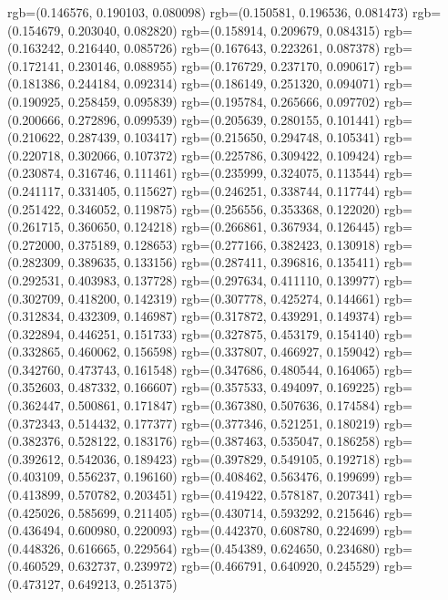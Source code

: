 {{{					rgb=(0.146576, 0.190103, 0.080098)
					rgb=(0.150581, 0.196536, 0.081473)
					rgb=(0.154679, 0.203040, 0.082820)
					rgb=(0.158914, 0.209679, 0.084315)
					rgb=(0.163242, 0.216440, 0.085726)
					rgb=(0.167643, 0.223261, 0.087378)
					rgb=(0.172141, 0.230146, 0.088955)
					rgb=(0.176729, 0.237170, 0.090617)
					rgb=(0.181386, 0.244184, 0.092314)
					rgb=(0.186149, 0.251320, 0.094071)
					rgb=(0.190925, 0.258459, 0.095839)
					rgb=(0.195784, 0.265666, 0.097702)
					rgb=(0.200666, 0.272896, 0.099539)
					rgb=(0.205639, 0.280155, 0.101441)
					rgb=(0.210622, 0.287439, 0.103417)
					rgb=(0.215650, 0.294748, 0.105341)
					rgb=(0.220718, 0.302066, 0.107372)
					rgb=(0.225786, 0.309422, 0.109424)
					rgb=(0.230874, 0.316746, 0.111461)
					rgb=(0.235999, 0.324075, 0.113544)
					rgb=(0.241117, 0.331405, 0.115627)
					rgb=(0.246251, 0.338744, 0.117744)
					rgb=(0.251422, 0.346052, 0.119875)
					rgb=(0.256556, 0.353368, 0.122020)
					rgb=(0.261715, 0.360650, 0.124218)
					rgb=(0.266861, 0.367934, 0.126445)
					rgb=(0.272000, 0.375189, 0.128653)
					rgb=(0.277166, 0.382423, 0.130918)
					rgb=(0.282309, 0.389635, 0.133156)
					rgb=(0.287411, 0.396816, 0.135411)
					rgb=(0.292531, 0.403983, 0.137728)
					rgb=(0.297634, 0.411110, 0.139977)
					rgb=(0.302709, 0.418200, 0.142319)
					rgb=(0.307778, 0.425274, 0.144661)
					rgb=(0.312834, 0.432309, 0.146987)
					rgb=(0.317872, 0.439291, 0.149374)
					rgb=(0.322894, 0.446251, 0.151733)
					rgb=(0.327875, 0.453179, 0.154140)
					rgb=(0.332865, 0.460062, 0.156598)
					rgb=(0.337807, 0.466927, 0.159042)
					rgb=(0.342760, 0.473743, 0.161548)
					rgb=(0.347686, 0.480544, 0.164065)
					rgb=(0.352603, 0.487332, 0.166607)
					rgb=(0.357533, 0.494097, 0.169225)
					rgb=(0.362447, 0.500861, 0.171847)
					rgb=(0.367380, 0.507636, 0.174584)
					rgb=(0.372343, 0.514432, 0.177377)
					rgb=(0.377346, 0.521251, 0.180219)
					rgb=(0.382376, 0.528122, 0.183176)
					rgb=(0.387463, 0.535047, 0.186258)
					rgb=(0.392612, 0.542036, 0.189423)
					rgb=(0.397829, 0.549105, 0.192718)
					rgb=(0.403109, 0.556237, 0.196160)
					rgb=(0.408462, 0.563476, 0.199699)
					rgb=(0.413899, 0.570782, 0.203451)
					rgb=(0.419422, 0.578187, 0.207341)
					rgb=(0.425026, 0.585699, 0.211405)
					rgb=(0.430714, 0.593292, 0.215646)
					rgb=(0.436494, 0.600980, 0.220093)
					rgb=(0.442370, 0.608780, 0.224699)
					rgb=(0.448326, 0.616665, 0.229564)
					rgb=(0.454389, 0.624650, 0.234680)
					rgb=(0.460529, 0.632737, 0.239972)
					rgb=(0.466791, 0.640920, 0.245529)
					rgb=(0.473127, 0.649213, 0.251375)
}}}
